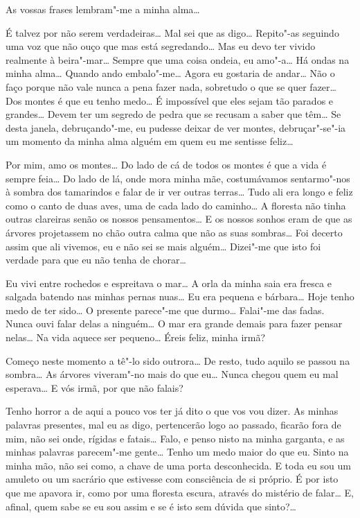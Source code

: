  As vossas frases lembram"-me a minha alma\ldots{}

 É talvez por não serem verdadeiras\ldots{}
Mal sei que as digo\ldots{}
Repito"-as seguindo uma voz que não ouço que mas está
segredando\ldots{}
Mas eu devo ter vivido realmente à beira"-mar\ldots{}
Sempre que uma coisa
ondeia, eu amo"-a\ldots{} Há ondas na minha alma\ldots{}
Quando ando
embalo"-me\ldots{} Agora eu gostaria de andar\ldots{} 
Não o faço porque não vale
nunca a pena fazer nada, sobretudo o que se quer
fazer\ldots{} Dos montes é
que eu tenho medo\ldots{} É impossível que eles sejam tão parados e
grandes\ldots{} Devem ter um segredo de pedra que se 
recusam a saber que
têm\ldots{} Se desta janela, debruçando"-me,
eu pudesse deixar de ver
montes, debruçar"-se"-ia um momento da minha
alma alguém em quem eu
me sentisse feliz\ldots{}

 Por mim, amo os montes\ldots{}
Do lado de cá de todos os montes é
que a vida é sempre feia\ldots{} Do lado de lá,
onde mora minha mãe,
costumávamos sentarmo"-nos à sombra dos
tamarindos e falar de ir ver
outras terras\ldots{} Tudo ali era longo e
feliz como o canto de duas aves,
uma de cada lado do caminho\ldots{} A floresta
não tinha outras clareiras
senão os nossos pensamentos\ldots{} E os nossos
sonhos eram de que as
árvores projetassem no chão outra calma que
não as suas sombras\ldots{} Foi
decerto assim que ali vivemos, eu e não sei se mais alguém\ldots{}
Dizei"-me que isto foi verdade para que eu não
tenha de chorar\ldots{}

 Eu vivi entre rochedos e espreitava
o mar\ldots{} A orla da minha
saia era fresca e salgada batendo nas minhas pernas
nuas\ldots{} Eu era
pequena e bárbara\ldots{} Hoje tenho medo de 
ter sido\ldots{} 
O presente
parece"-me que durmo\ldots{} 
Falai"-me das fadas. 
Nunca ouvi falar delas a
ninguém\ldots{} O mar era grande demais para fazer
pensar nelas\ldots{} Na vida
aquece ser pequeno\ldots{} Éreis feliz, minha irmã?

 Começo neste momento a tê"-lo
sido outrora\ldots{} De resto, tudo
aquilo se passou na sombra\ldots{} As árvores
viveram"-no mais do que
eu\ldots{} Nunca chegou quem eu mal esperava\ldots{}
E vós irmã, por que não falais? 

 Tenho horror a de aqui a pouco vos
ter já dito o que vos vou
dizer. As minhas palavras presentes, mal eu
as digo, pertencerão logo
ao passado, ficarão fora de mim, não sei onde, 
rígidas e fatais\ldots{}
Falo, e penso nisto na minha garganta, e as minhas palavras
parecem"-me gente\ldots{} Tenho um medo maior 
do que eu. Sinto na minha
mão, não sei como, a chave de uma porta desconhecida.
E toda eu sou um
amuleto ou um sacrário que estivesse com consciência
de si próprio. É
por isto que me apavora ir, como por uma
floresta escura, através do
mistério de falar\ldots{} E, afinal, quem sabe se
eu sou assim e se é isto
sem dúvida que sinto?\ldots{}

